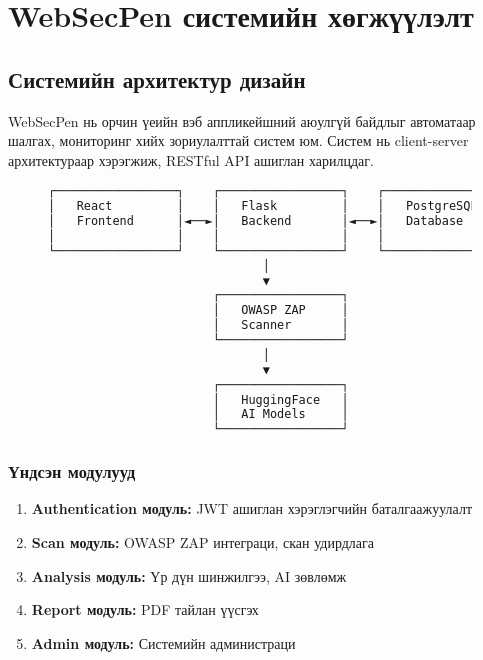 \documentclass[main.tex]{subfiles}
\begin{document}
\section{WebSecPen системийн хөгжүүлэлт}

\subsection{Системийн архитектур дизайн}

WebSecPen нь орчин үеийн вэб аппликейшний аюулгүй байдлыг автоматаар шалгах, мониторинг хийх зориулалттай систем юм. Систем нь client-server архитектураар хэрэгжиж, RESTful API ашиглан харилцдаг.

\begin{figure}[h]
\centering
\begin{lstlisting}[language=bash, caption=Системийн архитектурын бүрэлдэхүүн]
┌─────────────────┐    ┌─────────────────┐    ┌─────────────────┐
│   React         │    │   Flask         │    │   PostgreSQL    │
│   Frontend      │◄──►│   Backend       │◄──►│   Database      │
│                 │    │                 │    │                 │
└─────────────────┘    └─────────────────┘    └─────────────────┘
                              │
                              ▼
                       ┌─────────────────┐
                       │   OWASP ZAP     │
                       │   Scanner       │
                       └─────────────────┘
                              │
                              ▼
                       ┌─────────────────┐
                       │   HuggingFace   │
                       │   AI Models     │
                       └─────────────────┘
\end{lstlisting}
\end{figure}

\subsubsection{Үндсэн модулууд}
\begin{enumerate}
    \item \textbf{Authentication модуль:} JWT ашиглан хэрэглэгчийн баталгаажуулалт
    \item \textbf{Scan модуль:} OWASP ZAP интеграци, скан удирдлага
    \item \textbf{Analysis модуль:} Үр дүн шинжилгээ, AI зөвлөмж
    \item \textbf{Report модуль:} PDF тайлан үүсгэх
    \item \textbf{Admin модуль:} Системийн администраци
\end{enumerate}
\end{document}
